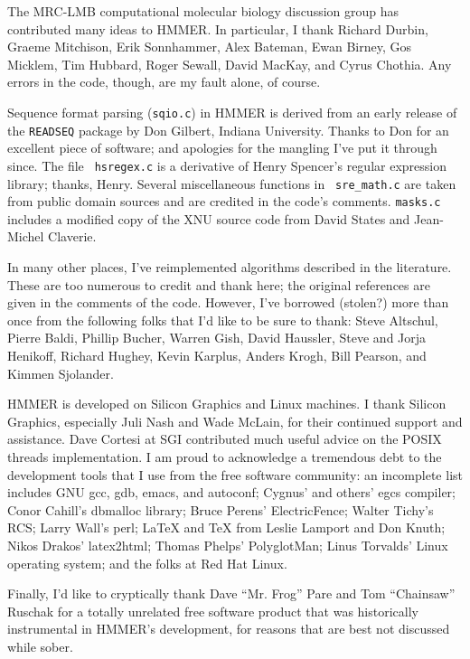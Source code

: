The MRC-LMB computational molecular biology discussion group has
contributed many ideas to HMMER. In particular, I thank Richard
Durbin, Graeme Mitchison, Erik Sonnhammer, Alex Bateman, Ewan Birney,
Gos Micklem, Tim Hubbard, Roger Sewall, David MacKay, and Cyrus
Chothia. Any errors in the code, though, are my fault alone, of
course.

Sequence format parsing ({\tt sqio.c}) in HMMER is derived from an
early release of the {\tt READSEQ} package by Don Gilbert, Indiana
University. Thanks to Don for an excellent piece of software; and
apologies for the mangling I've put it through since.  The file {\tt
hsregex.c} is a derivative of Henry Spencer's regular expression
library; thanks, Henry. Several miscellaneous functions in {\tt
sre\_math.c} are taken from public domain sources and are credited in
the code's comments. {\tt masks.c} includes a modified copy of the XNU
source code from David States and Jean-Michel Claverie.

In many other places, I've reimplemented algorithms described in the
literature. These are too numerous to credit and thank here; the
original references are given in the comments of the code. However,
I've borrowed (stolen?) more than once from the following folks that
I'd like to be sure to thank: Steve Altschul, Pierre Baldi, Phillip
Bucher, Warren Gish, David Haussler, Steve and Jorja Henikoff, Richard
Hughey, Kevin Karplus, Anders Krogh, Bill Pearson, and Kimmen
Sjolander.

HMMER is developed on Silicon Graphics and Linux machines.  I thank
Silicon Graphics, especially Juli Nash and Wade McLain, for their
continued support and assistance. Dave Cortesi at SGI contributed much
useful advice on the POSIX threads implementation. I am proud to
acknowledge a tremendous debt to the development tools that I use from
the free software community: an incomplete list includes GNU gcc, gdb,
emacs, and autoconf; Cygnus' and others' egcs compiler; Conor Cahill's
dbmalloc library; Bruce Perens' ElectricFence; Walter Tichy's RCS;
Larry Wall's perl; LaTeX and TeX from Leslie Lamport and Don Knuth;
Nikos Drakos' latex2html; Thomas Phelps' PolyglotMan; Linus Torvalds'
Linux operating system; and the folks at Red Hat Linux.

Finally, I'd like to cryptically thank Dave ``Mr. Frog'' Pare and Tom
``Chainsaw'' Ruschak for a totally unrelated free software product
that was historically instrumental in HMMER's development, for reasons
that are best not discussed while sober.

